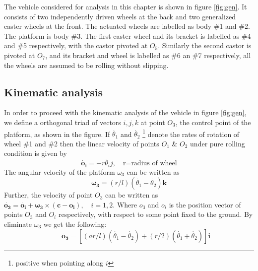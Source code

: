  The vehicle considered for analysis in this chapter is shown in figure \ref{fig:gen}. It consists of two independently driven wheels at the back and two generalized caster wheels at the front. The actuated wheels are labelled as body \#1 and \#2. The platform is body \#3. The first caster wheel and its bracket is labelled as \#4 and \#5 respectively, with the castor pivoted at $O_5$. Similarly the second castor is pivoted at $O_7$, and its bracket and wheel is labelled as \#6 an \#7 respectively, all the wheels are assumed to be rolling without slipping.  
\subsection{Kinematic analysis}
In order to proceed with the kinematic analysis of the vehicle in figure \ref{fig:gen}, we define a orthogonal triad of vectors ${i,j,k}$ at point $O_3$, the control point of the platform, as shown in the figure. If $\dot{\theta_1}$ and $\dot{\theta_2}$ \footnote{ positive when pointing along $i$} denote the rates of rotation of wheel \#1 and \#2 then the linear velocity of points $O_1$ \& $O_2$ under pure rolling condition is given by 
\begin{equation}
\label{velO1}
\bm{\dot{o_i}}=-r\dot{\theta_i}j, \quad \text{r=radius of wheel}
\end{equation}
The angular velocity of the platform $\omega_3$ can be written as 
\begin{equation}
\label{omegaPlat}
\bm{\omega_3}=(r/l)(\dot{\theta_1}-\dot{\theta_2})\bm{k}
\end{equation}
Further, the velocity of point $O_3$ can be written as
$\bm{\dot{o_3}=\dot{o_i}+\omega_3 \times (c-o_i)}, \quad i=1,2$. Where $o_3 $ and $o_i$  is the position vector of points $O_3$ and $O_i$ respectively, with respect to some  point fixed to the ground. By eliminate $\omega_3$  we get the following:
\begin{equation}
\label{velPlat}
 \quad \quad \bm{\dot{o_3}}=[(ar/l)(\dot{\theta_1}-\dot{\theta_2})+(r/2)(\dot{\theta_1}+\dot{\theta_2})]\bm{i}
\end{equation}

